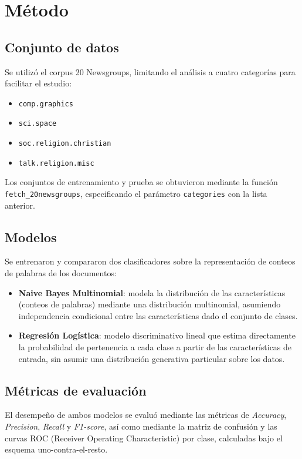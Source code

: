 \documentclass[journal]{IEEEtran}
\begin{document}
\section{Método}

\subsection{Conjunto de datos}
Se utilizó el corpus 20 Newsgroups, limitando el análisis a cuatro categorías para facilitar el estudio:

\begin{itemize}
    \item \texttt{comp.graphics}
    \item \texttt{sci.space}
    \item \texttt{soc.religion.christian}
    \item \texttt{talk.religion.misc}
\end{itemize}

Los conjuntos de entrenamiento y prueba se obtuvieron mediante la función \texttt{fetch\_20newsgroups}, especificando el parámetro \texttt{categories} con la lista anterior.

\subsection{Modelos}
Se entrenaron y compararon dos clasificadores sobre la representación de conteos de palabras de los documentos:

\begin{itemize}
    \item \textbf{Naive Bayes Multinomial}: modela la distribución de las características (conteos de palabras) mediante una distribución multinomial, asumiendo independencia condicional entre las características dado el conjunto de clases.
    \item \textbf{Regresión Logística}: modelo discriminativo lineal que estima directamente la probabilidad de pertenencia a cada clase a partir de las características de entrada, sin asumir una distribución generativa particular sobre los datos.
\end{itemize}

\subsection{Métricas de evaluación}
El desempeño de ambos modelos se evaluó mediante las métricas de \emph{Accuracy}, \emph{Precision}, \emph{Recall} y \emph{F1-score}, así como mediante la matriz de confusión y las curvas ROC (Receiver Operating Characteristic) por clase, calculadas bajo el esquema uno-contra-el-resto.
\end{document}
